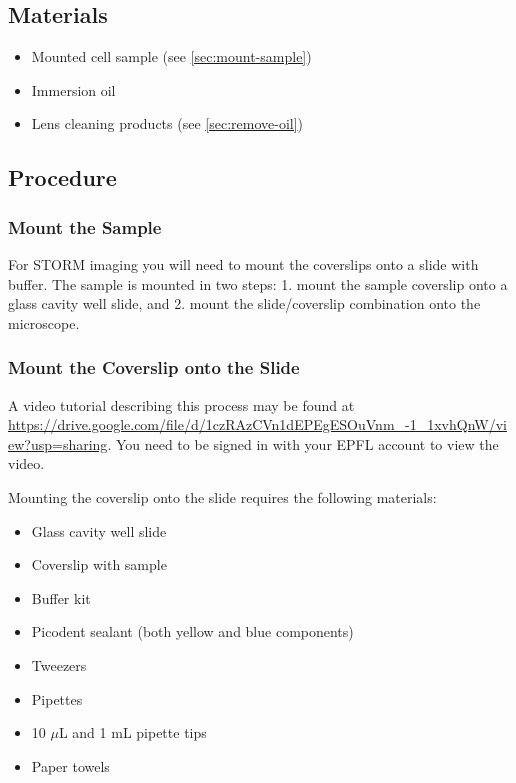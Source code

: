 \documentclass[10pt,a4paper,oneside]{book}
\begin{document}
\subsection{Materials}

\begin{itemize}
    \item{Mounted cell sample (see \autoref{sec:mount-sample})}
    \item{Immersion oil}
    \item{Lens cleaning products (see \autoref{sec:remove-oil})}
\end{itemize}

\subsection{Procedure}

\subsubsection{Mount the Sample}\label{sec:mount-sample}

For STORM imaging you will need to mount the coverslips onto a slide with buffer. The sample is mounted in two steps: 1. mount the sample coverslip onto a glass cavity well slide, and 2. mount the slide/coverslip combination onto the microscope.

\subsubsection{Mount the Coverslip onto the Slide}

\newline

A video tutorial describing this process may be found at \url{https://drive.google.com/file/d/1czRAzCVn1dEPEgESOuVnm_-1_1xvhQnW/view?usp=sharing}. You need to be signed in with your EPFL account to view the video.

Mounting the coverslip onto the slide requires the following materials:

\begin{itemize}
    \item{Glass cavity well slide}
    \item{Coverslip with sample}
    \item{Buffer kit}
    \item{Picodent sealant (both yellow and blue components)}
    \item{Tweezers}
    \item{Pipettes}
    \item{10 $\mu$L and 1 mL pipette tips}
    \item{Paper towels}
\end{itemize}
\end{document}
